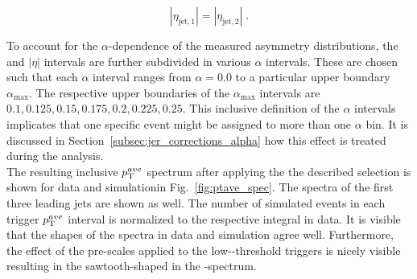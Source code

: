\begin{equation}
|\eta_{\mathrm{jet},1}| = |\eta_{\mathrm{jet},2}| \; .
\end{equation}
\begin{table}[!tp]
\centering
\caption{Overview of the $|\eta|$ and $\pt^{ave}$ interval boundaries used for the resolution measurement.}
\label{tab:binning}
\end{table} 
To account for the $\alpha$-dependence of the measured asymmetry distributions, the \ptave and $|\eta|$ intervals are further subdivided in various $\alpha$ intervals. These are chosen such that each $\alpha$ interval ranges from $\alpha = 0.0$ to a particular upper boundary $\alpha_\mathrm{max}$. The respective upper boundaries of the $\alpha_\mathrm{max}$ intervals are $0.1, 0.125, 0.15, 0.175, 0.2, 0.225, 0.25$. This inclusive definition of the $\alpha$ intervals implicates that one specific event might be assigned to more than one $\alpha$ bin. It is discussed in Section~\ref{subsec:jer_corrections_alpha} how this effect is treated during the analysis. \\
The resulting inclusive $\pt^{ave}$ spectrum after applying the the described selection is shown for data and simulationin Fig.~\ref{fig:ptave_spec}. The \pt spectra of the first three leading jets are shown as well. The number of simulated events in each trigger $\pt^{ave}$ interval is normalized to the respective integral in data. It is visible that the shapes of the spectra in data and simulation agree well. Furthermore, the effect of the pre-scales applied to the low-\ptave-threshold triggers is nicely visible resulting in the sawtooth-shaped in the \ptave-spectrum. \\ 

